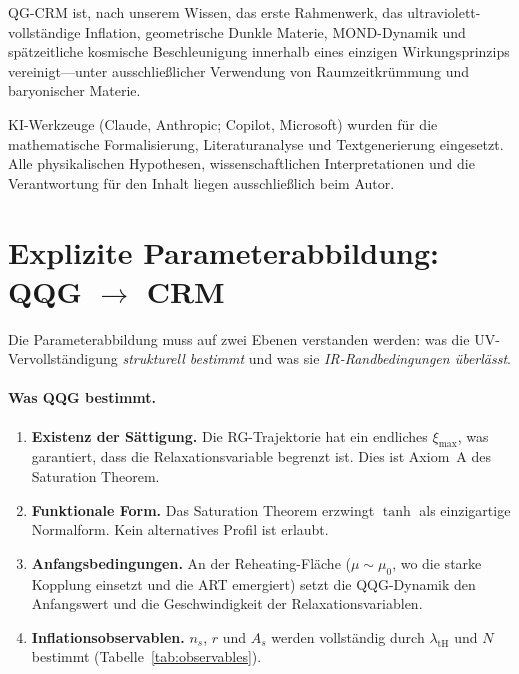 \documentclass[aps,prd,twocolumn,superscriptaddress,nofootinbib]{revtex4-2}
\begin{document}
QG-CRM ist, nach unserem Wissen, das erste Rahmenwerk, das ultraviolett-vollständige Inflation, geometrische Dunkle Materie, MOND-Dynamik und spätzeitliche kosmische Beschleunigung innerhalb eines einzigen Wirkungsprinzips vereinigt---unter ausschließlicher Verwendung von Raumzeitkrümmung und baryonischer Materie.


\begin{acknowledgments}
KI-Werkzeuge (Claude, Anthropic; Copilot, Microsoft) wurden für die mathematische Formalisierung, Literaturanalyse und Textgenerierung eingesetzt. Alle physikalischen Hypothesen, wissenschaftlichen Interpretationen und die Verantwortung für den Inhalt liegen ausschließlich beim Autor.
\end{acknowledgments}


\appendix

\section{Explizite Parameterabbildung: QQG $\to$ CRM}
\label{app:parameter-mapping}

Die Parameterabbildung muss auf zwei Ebenen verstanden werden: was die UV-Vervollständigung \textit{strukturell bestimmt} und was sie \textit{IR-Randbedingungen überlässt}.

\paragraph{Was QQG bestimmt.}
\begin{enumerate}
\item \textbf{Existenz der Sättigung.} Die RG-Trajektorie hat ein endliches $\xi_\mathrm{max}$, was garantiert, dass die Relaxationsvariable begrenzt ist. Dies ist Axiom~A des Saturation Theorem.
\item \textbf{Funktionale Form.} Das Saturation Theorem erzwingt $\tanh$ als einzigartige Normalform. Kein alternatives Profil ist erlaubt.
\item \textbf{Anfangsbedingungen.} An der Reheating-Fläche ($\mu \sim \mu_0$, wo die starke Kopplung einsetzt und die ART emergiert) setzt die QQG-Dynamik den Anfangswert und die Geschwindigkeit der Relaxationsvariablen.
\item \textbf{Inflationsobservablen.} $n_s$, $r$ und $A_s$ werden vollständig durch $\lambda_\mathrm{tH}$ und $N$ bestimmt (Tabelle~\ref{tab:observables}).
\end{enumerate}
\end{document}
